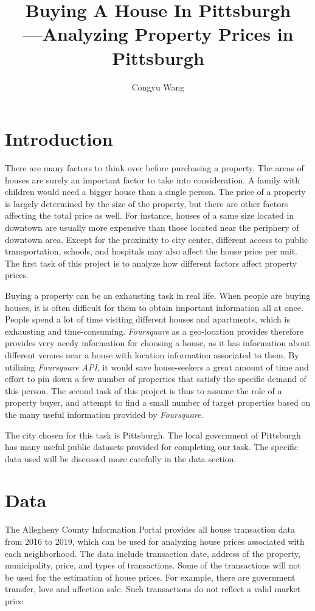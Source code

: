 \documentclass[11pt,notitlepage]{article}
\begin{document}
\title{Buying A House In Pittsburgh\\
\vspace*{0.2em}
\large{---Analyzing Property Prices in Pittsburgh}}
\author{Congyu Wang}
\maketitle

\section{Introduction}
There are many factors to think over before purchasing a property.
The areas of houses are surely an important factor to take into consideration.
A family with children would need a bigger house than a single person.
The price of a property is largely determined by the size of the property,
but there are other factors affecting the total price as well.
For instance, houses of a same size located in downtown are usually more
expensive than those located near the periphery of downtown area.
Except for the proximity to city center,
different access to public transportation, schools, and hospitals
may also affect the house price per unit.
The first task of this project is to analyze how different factors
affect property prices.

Buying a property can be an exhausting task in real life.
When people are buying houses, it is often difficult for them to obtain important
information all at once.
People spend a lot of time visiting different houses and apartments,
which is exhausting and time-consuming.
\textit{Foursquare} as a geo-location provides therefore provides
very needy information for choosing a house, as it has information about
different venues near a house with location information associated to them.
By utilizing \textit{Foursquare API}, it would save house-seekers a
great amount of time and effort to pin down a few number of properties
that satisfy the specific demand of this person.
The second task of this project is thus to assume the role of a property buyer,
and attempt to find a small number of target properties based on the many
useful information provided by \textit{Foursquare}.

The city chosen for this task is Pittsburgh. The local government of Pittsburgh
has many useful public datasets provided for completing our task.
The specific data used will be discussed more carefully in the data section.

\section{Data}
The Allegheny County Information Portal provides all house transaction data
from 2016 to 2019, which can be used for analyzing house prices associated with
each neighborhood. The data include transaction date, address of the property,
municipality, price, and types of transactions.
Some of the transactions will not be used for the estimation of house prices.
For example, there are government transfer, love and affection sale.
Such transactions do not reflect a valid market price.
\end{document}
